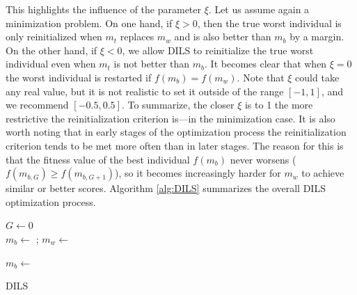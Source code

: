 \documentclass[review]{elsarticle}
\begin{document}
This highlights the influence of the parameter $\xi$. Let us assume again a minimization problem. On one hand, if $\xi > 0$, then the true worst individual is only reinitialized when $m_t$ replaces $m_w$ and is also better than $m_b$ by a margin. On the other hand, if $\xi < 0$, we allow DILS to reinitialize the true worst individual even when $m_t$ is not better than $m_b$. It becomes clear that when $\xi = 0$ the worst individual is restarted if $f(m_b) = f(m_w)$. Note that $\xi$ could take any real value, but it is not realistic to set it outside of the range $[-1,1]$, and we recommend $[-0.5, 0.5]$. To summarize, the closer $\xi$ is to 1 the more restrictive the reinitialization criterion is---in the minimization case. It is also worth noting that in early stages of the optimization process the reinitialization criterion tends to be met more often than in later stages. The reason for this is that the fitness value of the best individual $f(m_b)$ never worsens ($f(m_{b,G}) \ge f(m_{b,G+1})$), so it becomes increasingly harder for $m_w$ to achieve similar or better scores. Algorithm \ref{alg:DILS} summarizes the overall DILS optimization process.

\begin{algorithm}
	\SetNlSkip{0.5em}
	$G \leftarrow 0$\\
	$m_b \leftarrow$ \RandInit{};
	$m_w \leftarrow$ \RandInit{}\\
	
	$m_b \leftarrow $ \\
\caption{DILS}\label{alg:DILS}
\end{algorithm}
\end{document}
